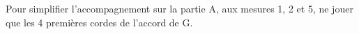 
\tune

Pour simplifier l'accompagnement sur la partie A, aux mesures 1, 2 et 5, ne
jouer que les 4 premières cordes de l'accord de G.